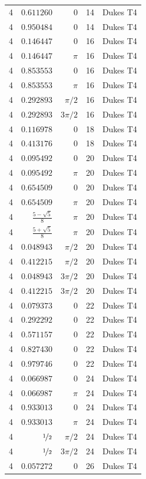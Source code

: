 \begin{longtable}{rrrrc}
4 & $0.611260$ & $0$ & 14 & Dukes T4 \\
4 & $0.950484$ & $0$ & 14 & Dukes T4 \\
4 & $0.146447$ & $0$ & 16 & Dukes T4 \\
4 & $0.146447$ & $\pi$ & 16 & Dukes T4 \\
4 & $0.853553$ & $0$ & 16 & Dukes T4 \\
4 & $0.853553$ & $\pi$ & 16 & Dukes T4 \\
4 & $0.292893$ & $\pi/2$ & 16 & Dukes T4 \\
4 & $0.292893$ & $3\pi/2$ & 16 & Dukes T4 \\
4 & $0.116978$ & $0$ & 18 & Dukes T4 \\
4 & $0.413176$ & $0$ & 18 & Dukes T4 \\
4 & $0.095492$ & $0$ & 20 & Dukes T4 \\
4 & $0.095492$ & $\pi$ & 20 & Dukes T4 \\
4 & $0.654509$ & $0$ & 20 & Dukes T4 \\
4 & $0.654509$ & $\pi$ & 20 & Dukes T4 \\
4 & $\frac{5 - \sqrt{5}}{8}$ & $\pi$ & 20 & Dukes T4 \\
4 & $\frac{5 + \sqrt{5}}{8}$ & $\pi$ & 20 & Dukes T4 \\
4 & $0.048943$ & $\pi/2$ & 20 & Dukes T4 \\
4 & $0.412215$ & $\pi/2$ & 20 & Dukes T4 \\
4 & $0.048943$ & $3\pi/2$ & 20 & Dukes T4 \\
4 & $0.412215$ & $3\pi/2$ & 20 & Dukes T4 \\
4 & $0.079373$ & $0$ & 22 & Dukes T4 \\
4 & $0.292292$ & $0$ & 22 & Dukes T4 \\
4 & $0.571157$ & $0$ & 22 & Dukes T4 \\
4 & $0.827430$ & $0$ & 22 & Dukes T4 \\
4 & $0.979746$ & $0$ & 22 & Dukes T4 \\
4 & $0.066987$ & $0$ & 24 & Dukes T4 \\
4 & $0.066987$ & $\pi$ & 24 & Dukes T4 \\
4 & $0.933013$ & $0$ & 24 & Dukes T4 \\
4 & $0.933013$ & $\pi$ & 24 & Dukes T4 \\
4 & $\nicefrac{1}{2}$ & $\pi/2$ & 24 & Dukes T4 \\
4 & $\nicefrac{1}{2}$ & $3\pi/2$ & 24 & Dukes T4 \\
4 & $0.057272$ & $0$ & 26 & Dukes T4 \\

\end{longtable}
